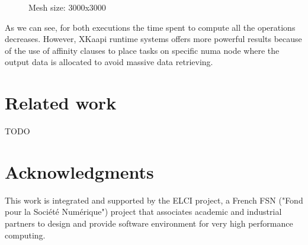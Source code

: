 \documentclass{Styles/llncs}
\begin{document}
\begin{figure}
  \centering
    \caption{Mesh size: 3000x3000}
    \label{figs:spmv:3000}
\end{figure}

As we can see, for both executions the time spent to compute all the operations decreases. However, XKaapi runtime systems offers more powerful results because of the use of affinity clauses to place tasks on specific numa node where the output data is allocated to avoid massive data retrieving.


\section{Related work}

TODO


\section*{Acknowledgments}


This work is integrated and supported by the ELCI  project, a French FSN ("Fond pour la Société Numérique")
project that associates academic and industrial partners to design and provide software environment for very high performance
computing.
  \small 

\end{document}
